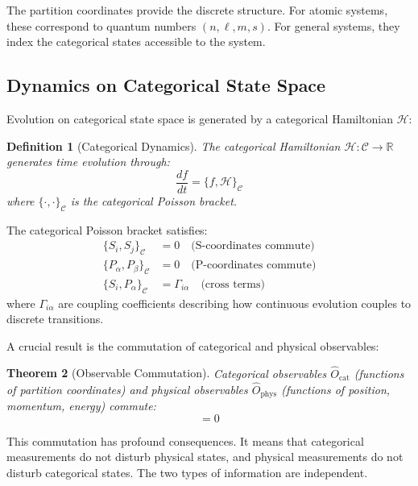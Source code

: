 \documentclass[twocolumn,10pt,aps,prd,superscriptaddress,nofootinbib]{revtex4-2}
\newtheorem{theorem}{Theorem}[section]
\newtheorem{definition}[theorem]{Definition}
\theoremstyle{remark}
\newcommand{\Cspace}{\mathcal{C}}
\newcommand{\Hcat}{\mathcal{H}}
\newcommand{\Ocat}{\hat{O}_{\mathrm{cat}}}
\newcommand{\Ophys}{\hat{O}_{\mathrm{phys}}}
\begin{document}
The partition coordinates provide the discrete structure. For atomic systems, these correspond to quantum numbers $(n, \ell, m, s)$. For general systems, they index the categorical states accessible to the system.

\subsection{Dynamics on Categorical State Space}

Evolution on categorical state space is generated by a categorical Hamiltonian $\Hcat$:

\begin{definition}[Categorical Dynamics]
\label{def:categorical_dynamics}
The categorical Hamiltonian $\Hcat: \Cspace \to \mathbb{R}$ generates time evolution through:
\begin{equation}
\frac{df}{dt} = \{f, \Hcat\}_{\Cspace}
\label{eq:categorical_evolution}
\end{equation}
where $\{\cdot, \cdot\}_{\Cspace}$ is the categorical Poisson bracket.
\end{definition}

The categorical Poisson bracket satisfies:
\begin{align}
\{S_i, S_j\}_{\Cspace} &= 0 \quad \text{(S-coordinates commute)} \label{eq:S_commute} \\
\{P_\alpha, P_\beta\}_{\Cspace} &= 0 \quad \text{(P-coordinates commute)} \label{eq:P_commute} \\
\{S_i, P_\alpha\}_{\Cspace} &= \Gamma_{i\alpha} \quad \text{(cross terms)} \label{eq:cross_terms}
\end{align}
where $\Gamma_{i\alpha}$ are coupling coefficients describing how continuous evolution couples to discrete transitions.

A crucial result is the commutation of categorical and physical observables:

\begin{theorem}[Observable Commutation]
\label{thm:commutation}
Categorical observables $\Ocat$ (functions of partition coordinates) and physical observables $\Ophys$ (functions of position, momentum, energy) commute:
\begin{equation}
[\Ocat, \Ophys] = 0
\label{eq:observable_commutation}
\end{equation}
\end{theorem}

This commutation has profound consequences. It means that categorical measurements do not disturb physical states, and physical measurements do not disturb categorical states. The two types of information are independent.
\end{document}
